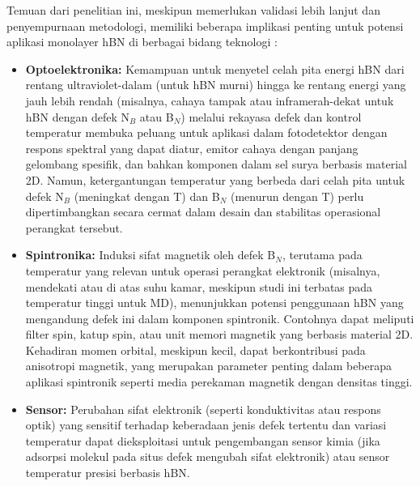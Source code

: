 \label{subsec:implikasi_aplikasi}
Temuan dari penelitian ini, meskipun memerlukan validasi lebih lanjut dan penyempurnaan metodologi, memiliki beberapa implikasi penting untuk potensi aplikasi monolayer hBN di berbagai bidang teknologi :
\begin{itemize}
    \item \textbf{Optoelektronika:} Kemampuan untuk menyetel celah pita energi hBN dari rentang ultraviolet-dalam (untuk hBN murni) hingga ke rentang energi yang jauh lebih rendah (misalnya, cahaya tampak atau inframerah-dekat untuk hBN dengan defek N$_B$ atau B$_N$) melalui rekayasa defek dan kontrol temperatur membuka peluang untuk aplikasi dalam fotodetektor dengan respons spektral yang dapat diatur, emitor cahaya dengan panjang gelombang spesifik, dan bahkan komponen dalam sel surya berbasis 
 material 2D. Namun, ketergantungan temperatur yang berbeda dari celah pita untuk defek N$_B$ (meningkat dengan T) dan B$_N$ (menurun dengan T) perlu dipertimbangkan secara cermat dalam desain dan stabilitas operasional perangkat tersebut. \item \textbf{Spintronika:} Induksi sifat magnetik oleh defek B$_N$, terutama pada temperatur yang relevan untuk operasi perangkat elektronik (misalnya, mendekati atau di atas suhu kamar, meskipun studi ini terbatas pada temperatur tinggi untuk MD), menunjukkan potensi penggunaan hBN yang mengandung defek ini dalam komponen spintronik. Contohnya dapat meliputi filter spin, katup spin, atau unit memori magnetik yang berbasis material 2D. Kehadiran momen orbital, meskipun kecil, dapat berkontribusi pada anisotropi magnetik, yang merupakan parameter penting dalam beberapa aplikasi spintronik seperti media perekaman magnetik dengan densitas tinggi. \item \textbf{Sensor:} Perubahan sifat elektronik (seperti konduktivitas atau respons optik) yang sensitif terhadap keberadaan jenis defek tertentu dan variasi temperatur dapat dieksploitasi untuk pengembangan sensor kimia (jika adsorpsi molekul pada situs defek mengubah sifat elektronik) atau sensor temperatur presisi berbasis hBN. \end{itemize}
